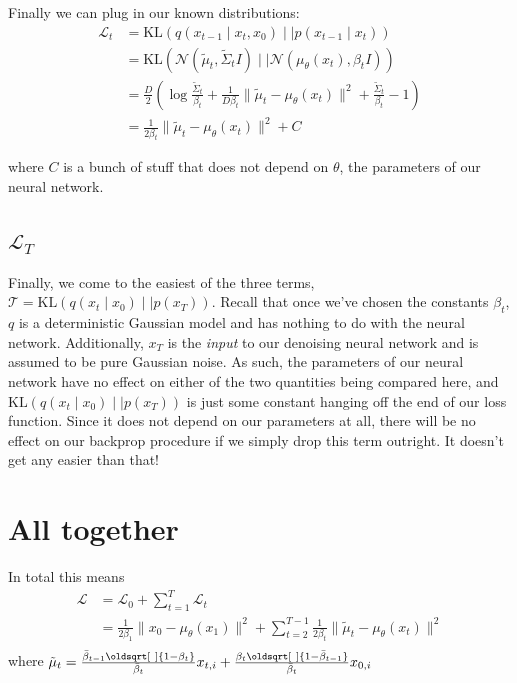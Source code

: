 \documentclass[11pt,dvipsnames]{article}
\renewcommand*{\sqrt}[2][\ ]{\oldsqrt[#1]{#2}}
\begin{document}
Finally we can plug in our known distributions:
\begin{equation*}
\begin{split}
\mathcal{L}_t &= \text{KL} \left( q(x_{t-1} \mid x_t, x_0) \mid\mid p(x_{t-1} \mid x_t) \right) \\
&= \text{KL}\left( \mathcal{N} \left(\tilde\mu_t, \tilde\Sigma_t I \right) \mid\mid \mathcal{N} \left( \mu_\theta(x_t), \beta_t I \right) \right) \\
&= \frac{D}{2} \left( \log \frac{\tilde\Sigma_t}{\beta_t} + \frac{1}{D\beta_t} \lVert \tilde\mu_t - \mu_\theta(x_t) \rVert^2 + \frac{\tilde\Sigma_t}{\beta_t} - 1 \right) \\
&= \frac{1}{2\beta_t} \lVert \tilde\mu_t - \mu_\theta(x_t) \rVert^2 + C
\end{split}
\end{equation*}

where $C$ is a bunch of stuff that does not depend on $\theta$, the parameters of our neural network.


\subsection{$\mathcal{L}_T$}
Finally, we come to the easiest of the three terms, $\mathcal{T} = \text{KL}(q(x_t \mid x_0) \mid\mid p(x_T))$.
Recall that once we've chosen the constants $\beta_t$, $q$ is a deterministic Gaussian model and has nothing to
do with the neural network. Additionally, $x_T$ is the \emph{input} to our denoising neural network and is
assumed to be pure Gaussian noise. As such, the parameters of our neural network have no effect on either of the
two quantities being compared here, and $\text{KL}(q(x_t \mid x_0) \mid\mid p(x_T))$ is just some constant hanging
off the end of our loss function. Since it does not depend on our parameters at all, there will be no effect on our
backprop procedure if we simply drop this term outright. It doesn't get any easier than that!

\section{All together}
In total this means
\begin{equation*}
\begin{split}
\mathcal{L} &= \mathcal{L}_0 + \sum_{t=1}^{T} \mathcal{L}_t \\
&= \frac{1}{2\beta_1} \lVert x_0 - \mu_\theta(x_1) \rVert^2 + \sum_{t=2}^{T-1} \frac{1}{2\beta_t} \lVert \tilde\mu_t - \mu_\theta(x_t) \rVert^2 \\
\end{split}
\end{equation*}
where $\tilde\mu_t = \frac{\bar\beta_{t-1}\sqrt{1 - \beta_t}}{\bar\beta_t} x_{t, i} + \frac{\beta_t\sqrt{1 - \bar\beta_{t-1}}}{\bar\beta_t} x_{0, i}$
\end{document}
